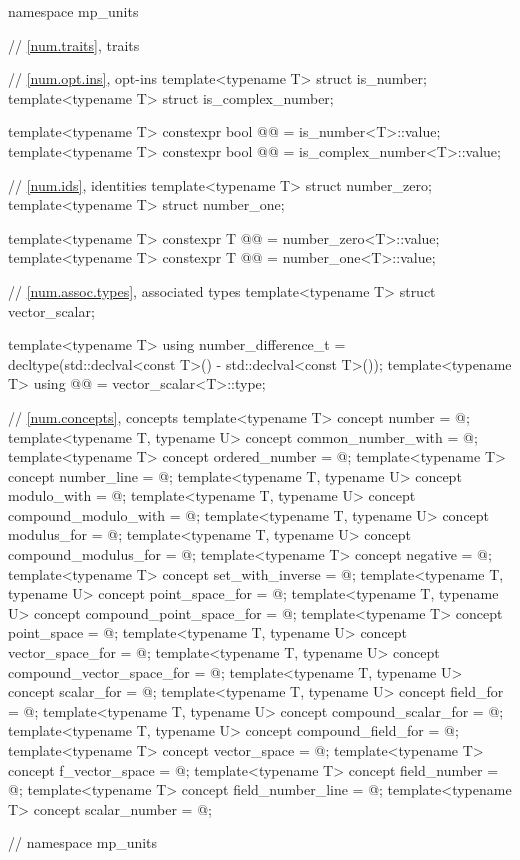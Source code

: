 \begin{codeblock}
namespace mp_units {

// \ref{num.traits}, traits

// \ref{num.opt.ins},  opt-ins
template<typename T>
struct is_number;
template<typename T>
struct is_complex_number;

template<typename T>
constexpr bool @@ = is_number<T>::value;
template<typename T>
constexpr bool @@ = is_complex_number<T>::value;

// \ref{num.ids}, identities
template<typename T>
struct number_zero;
template<typename T>
struct number_one;

template<typename T>
constexpr T @@ = number_zero<T>::value;
template<typename T>
constexpr T @@ = number_one<T>::value;

// \ref{num.assoc.types}, associated types
template<typename T>
struct vector_scalar;

template<typename T>
using number_difference_t = decltype(std::declval<const T>() - std::declval<const T>());
template<typename T>
using @@ = vector_scalar<T>::type;

// \ref{num.concepts}, concepts
template<typename T>
concept number = @\seebelow@;
template<typename T, typename U>
concept common_number_with = @\seebelow@;
template<typename T>
concept ordered_number = @\seebelow@;
template<typename T>
concept number_line = @\seebelow@;
template<typename T, typename U>
concept modulo_with = @\seebelow@;
template<typename T, typename U>
concept compound_modulo_with = @\seebelow@;
template<typename T, typename U>
concept modulus_for = @\seebelow@;
template<typename T, typename U>
concept compound_modulus_for = @\seebelow@;
template<typename T>
concept negative = @\seebelow@;
template<typename T>
concept set_with_inverse = @\seebelow@;
template<typename T, typename U>
concept point_space_for = @\seebelow@;
template<typename T, typename U>
concept compound_point_space_for = @\seebelow@;
template<typename T>
concept point_space = @\seebelow@;
template<typename T, typename U>
concept vector_space_for = @\seebelow@;
template<typename T, typename U>
concept compound_vector_space_for = @\seebelow@;
template<typename T, typename U>
concept scalar_for = @\seebelow@;
template<typename T, typename U>
concept field_for = @\seebelow@;
template<typename T, typename U>
concept compound_scalar_for = @\seebelow@;
template<typename T, typename U>
concept compound_field_for = @\seebelow@;
template<typename T>
concept vector_space = @\seebelow@;
template<typename T>
concept f_vector_space = @\seebelow@;
template<typename T>
concept field_number = @\seebelow@;
template<typename T>
concept field_number_line = @\seebelow@;
template<typename T>
concept scalar_number = @\seebelow@;

}  // namespace mp_units
\end{codeblock}

